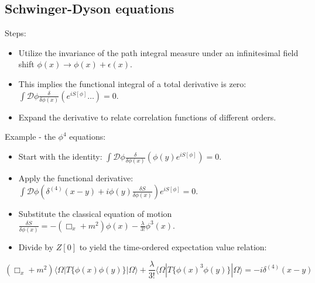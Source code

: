 \documentclass{article}
\begin{document}
\subsection{Schwinger-Dyson equations}
Steps:
\begin{itemize}
    \item Utilize the invariance of the path integral measure under an infinitesimal field shift $\phi(x) \to \phi(x) + \epsilon(x)$.
    \item This implies the functional integral of a total derivative is zero: $\int \mathcal{D}\phi \frac{\delta}{\delta \phi(x)} \left( e^{iS[\phi]} \dots \right) = 0$.
    \item Expand the derivative to relate correlation functions of different orders.
\end{itemize}
Example - the $\phi^4$ equations:
\begin{itemize}
    \item Start with the identity: $\int \mathcal{D}\phi \frac{\delta}{\delta \phi(x)} \left( \phi(y) e^{iS[\phi]} \right) = 0$.
    \item Apply the functional derivative: $\int \mathcal{D}\phi \left( \delta^{(4)}(x-y) + i \phi(y) \frac{\delta S}{\delta \phi(x)} \right) e^{iS[\phi]} = 0$.
    \item Substitute the classical equation of motion $\frac{\delta S}{\delta \phi(x)} = -(\Box_x + m^2)\phi(x) - \frac{\lambda}{3!}\phi^3(x)$.
    \item Divide by $Z[0]$ to yield the time-ordered expectation value relation:
\end{itemize}
\begin{equation}
    (\Box_x + m^2)\langle \Omega | T\{\phi(x)\phi(y)\} | \Omega \rangle + \frac{\lambda}{3!}\langle \Omega | T\{\phi(x)^3\phi(y)\} | \Omega \rangle = -i\delta^{(4)}(x-y)
\end{equation}
\end{document}
